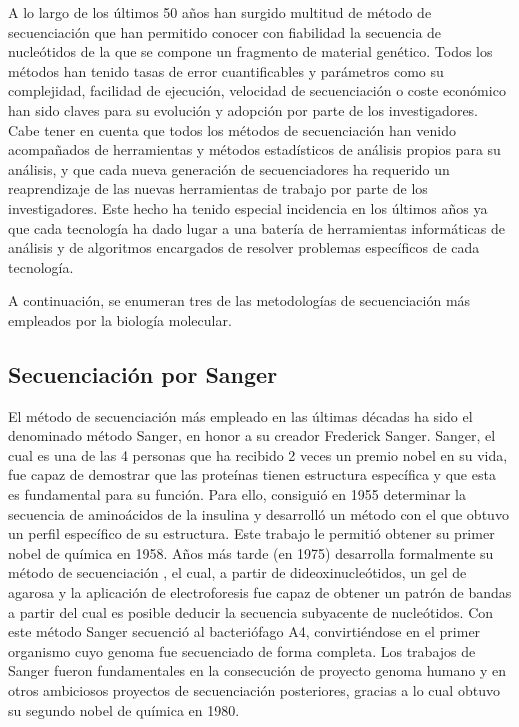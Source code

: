 A lo largo de los últimos 50 años han surgido multitud de método de secuenciación que han permitido conocer con fiabilidad la secuencia de nucleótidos de la que se compone un fragmento de material genético. Todos los métodos han tenido tasas de error cuantificables y parámetros como su complejidad, facilidad de ejecución, velocidad de secuenciación o coste económico han sido claves para su evolución y adopción por parte de los investigadores. Cabe tener en cuenta que todos los métodos de secuenciación han venido acompañados de herramientas y métodos estadísticos de análisis propios para su análisis, y que cada nueva generación de secuenciadores ha requerido un reaprendizaje de las nuevas herramientas de trabajo por parte de los investigadores. Este hecho ha tenido especial incidencia en los últimos años ya que cada tecnología ha dado lugar a una batería de herramientas informáticas de análisis y de algoritmos encargados de resolver problemas específicos de cada tecnología. 

A continuación, se enumeran tres de las metodologías de secuenciación más empleados por la biología molecular. 


\subsection{Secuenciación por Sanger}

El método de secuenciación más empleado en las últimas décadas ha sido el denominado método Sanger, en honor a su creador Frederick Sanger. Sanger, el cual es una de las 4 personas que ha recibido 2 veces un premio nobel en su vida, fue capaz de demostrar que las proteínas tienen estructura específica y que esta es fundamental para su función. Para ello, consiguió en 1955 determinar la secuencia de aminoácidos de la insulina y desarrolló un método con el que obtuvo un perfil específico de su estructura. Este trabajo le permitió obtener su primer nobel de química en 1958. Años más tarde (en 1975) desarrolla formalmente su método de secuenciación \cite{Sanger1977}, el cual, a partir de dideoxinucleótidos, un gel de agarosa y la aplicación de electroforesis fue capaz de obtener un patrón de bandas a partir del cual es posible deducir la secuencia subyacente de nucleótidos. Con este método Sanger secuenció al bacteriófago A4, convirtiéndose en el primer organismo cuyo genoma fue secuenciado de forma completa. Los trabajos de Sanger fueron fundamentales en la consecución de proyecto genoma humano y en otros ambiciosos proyectos de secuenciación posteriores, gracias a lo cual obtuvo su segundo nobel de química en 1980. 

